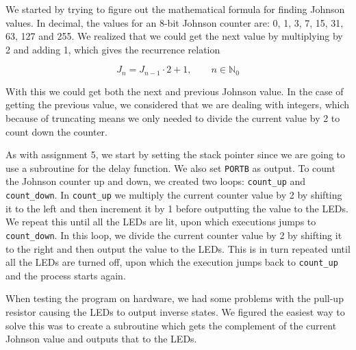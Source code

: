 We started by trying to figure out the mathematical formula for finding Johnson values. In decimal, the values for an 8-bit Johnson counter are: 0, 1, 3, 7, 15, 31, 63, 127 and 255. We realized that we could get the next value by multiplying by 2 and adding 1, which gives the recurrence relation

\begin{equation*}
    J_n = J_{n-1} \cdot 2 + 1, \qquad n \in \mathbb{N}_0
\end{equation*}

With this we could get both the next and previous Johnson value. In the case of getting the previous value, we considered that we are dealing with integers, which because of truncating means we only needed to divide the current value by 2 to count down the counter.

As with assignment 5, we start by setting the stack pointer since we are going to use a subroutine for the delay function. We also set \texttt{PORTB} as output. To count the Johnson counter up and down, we created two loops: \texttt{count\_up} and \texttt{count\_down}. In \texttt{count\_up} we multiply the current counter value by 2 by shifting it to the left and then increment it by 1 before outputting the value to the LEDs. We repeat this until all the LEDs are lit, upon which executions jumps to \texttt{count\_down}. In this loop, we divide the current counter value by 2 by shifting it to the right and then output the value to the LEDs. This is in turn repeated until all the LEDs are turned off, upon which the execution jumps back to \texttt{count\_up} and the process starts again.

When testing the program on hardware, we had some problems with the pull-up resistor causing the LEDs to output inverse states. We figured the easiest way to solve this was to create a subroutine which gets the complement of the current Johnson value and outputs that to the LEDs.
